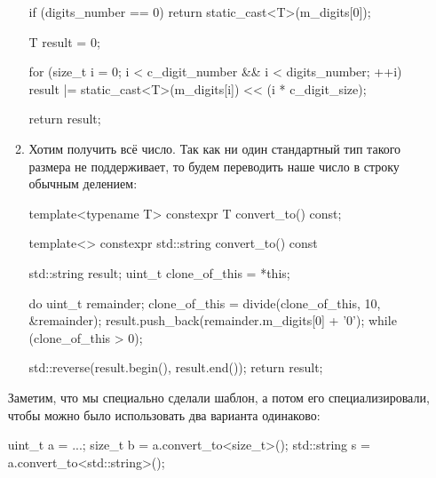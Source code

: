 \begin{itemize}
\begin{enumerate}
\begin{cppcode}
{    if (digits_number == 0) {
        return static_cast<T>(m_digits[0]);
    }

    T result = 0;

    for (size_t i = 0; i < c_digit_number && i < digits_number; ++i) {
        result |= static_cast<T>(m_digits[i]) << (i * c_digit_size);
    }

    return result;
} 
    \end{cppcode}
    \item Хотим получить всё число. Так как ни один стандартный тип такого размера не поддерживает, то будем переводить наше число в строку обычным делением:
    \begin{cppcode}
template<typename T>
constexpr T convert_to() const;

template<>
constexpr std::string convert_to() const {
    std::string result;
    uint_t clone_of_this = *this;

    do {
        uint_t remainder;
        clone_of_this = divide(clone_of_this, 10, &remainder);
        result.push_back(remainder.m_digits[0] + '0');
    } while (clone_of_this > 0);

    std::reverse(result.begin(), result.end());
    return result;
}
    \end{cppcode}
  \end{enumerate}
  Заметим, что мы специально сделали шаблон, а потом его специализировали, чтобы можно было использовать два варианта одинаково:
    \begin{cppcode}
uint_t a = ...;
size_t b = a.convert_to<size_t>();
std::string s = a.convert_to<std::string>();
    \end{cppcode}
\end{itemize}
